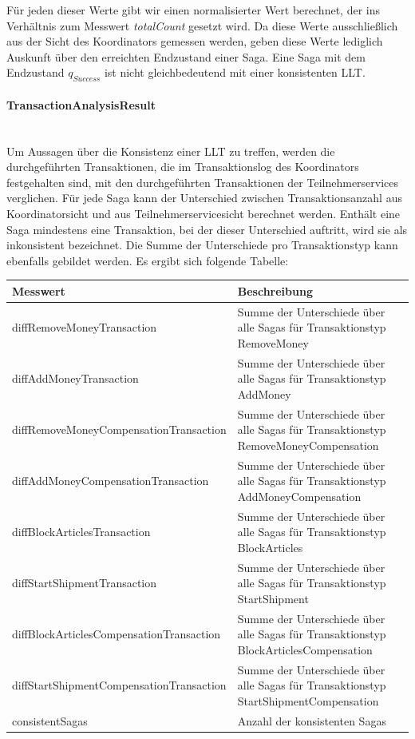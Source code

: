 Für jeden dieser Werte gibt wir einen normalisierter Wert berechnet, der ins Verhältnis zum Messwert \textit{totalCount} gesetzt wird. Da diese Werte ausschließlich aus der Sicht des Koordinators gemessen werden, geben diese Werte lediglich Auskunft über den erreichten Endzustand einer Saga. Eine Saga mit dem Endzustand $q_{Success}$ ist nicht gleichbedeutend mit einer konsistenten LLT. 

\paragraph*{TransactionAnalysisResult} \mbox{}\\
Um Aussagen über die Konsistenz einer LLT zu treffen, werden die durchgeführten Transaktionen, die im Transaktionslog des Koordinators festgehalten sind, mit den durchgeführten Transaktionen der Teilnehmerservices verglichen. Für jede Saga kann der Unterschied zwischen Transaktionsanzahl aus Koordinatorsicht und aus Teilnehmerservicesicht berechnet werden. Enthält eine Saga mindestens eine Transaktion, bei der dieser Unterschied auftritt, wird sie als inkonsistent bezeichnet. Die Summe der Unterschiede pro Transaktionstyp kann ebenfalls gebildet werden. Es ergibt sich folgende Tabelle:

\begin{center}
	\begin{longtable}[h]{|p{5cm}|p{9cm}|}
		\hline
		Messwert & Beschreibung \\ \hline
		diffRemoveMoney\-Transaction & Summe der Unterschiede über alle Sagas für Transaktionstyp RemoveMoney \\ \hline
		diffAddMoney\-Transaction & Summe der Unterschiede über alle Sagas für Transaktionstyp AddMoney \\ \hline
		diffRemoveMoney\-CompensationTransaction &  Summe der Unterschiede über alle Sagas für Transaktionstyp RemoveMoneyCompensation \\ \hline
		diffAddMoney\-CompensationTransaction &  Summe der Unterschiede über alle Sagas für Transaktionstyp AddMoneyCompensation \\ \hline
		diffBlockArticles\-Transaction &  Summe der Unterschiede über alle Sagas für Transaktionstyp BlockArticles \\ \hline
		diffStartShipment\-Transaction &  Summe der Unterschiede über alle Sagas für Transaktionstyp StartShipment \\ \hline
		diffBlockArticles\-CompensationTransaction &  Summe der Unterschiede über alle Sagas für Transaktionstyp BlockArticlesCompensation\\ \hline
		diffStartShipment\-CompensationTransaction &  Summe der Unterschiede über alle Sagas für Transaktionstyp StartShipmentCompensation\\ \hline
		consistentSagas & Anzahl der konsistenten Sagas \\ \hline	
	\end{longtable}
\end{center}
\FloatBarrier

